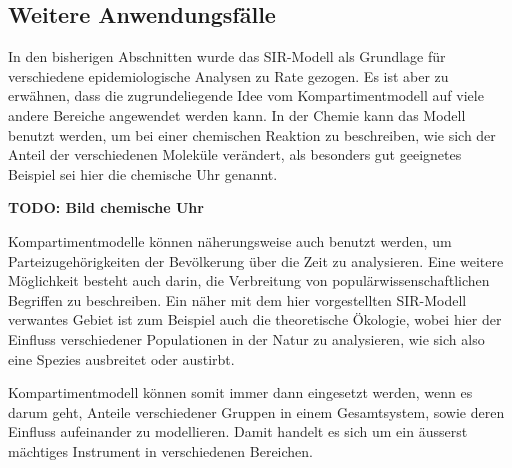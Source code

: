 \begin{refsection}
\section{Weitere Anwendungsfälle}
In den bisherigen Abschnitten wurde das SIR-Modell als Grundlage für verschiedene epidemiologische Analysen zu Rate gezogen.
Es ist aber zu erwähnen, dass die zugrundeliegende Idee vom Kompartimentmodell auf viele andere Bereiche angewendet werden kann.
In der Chemie kann das Modell benutzt werden, um bei einer chemischen Reaktion zu beschreiben, wie sich der Anteil der verschiedenen Moleküle verändert, als besonders gut geeignetes Beispiel sei hier die chemische Uhr genannt.

\textbf{TODO: Bild chemische Uhr}

Kompartimentmodelle können näherungsweise auch benutzt werden, um Parteizugehörigkeiten der Bevölkerung über die Zeit zu analysieren. 
Eine weitere Möglichkeit besteht auch darin, die Verbreitung von populärwissenschaftlichen Begriffen zu beschreiben. 
Ein näher mit dem hier vorgestellten SIR-Modell verwantes Gebiet ist zum Beispiel auch die theoretische Ökologie, wobei hier der Einfluss verschiedener Populationen in der Natur zu analysieren, wie sich also eine Spezies ausbreitet oder austirbt.

Kompartimentmodell können somit immer dann eingesetzt werden, wenn es darum geht, Anteile verschiedener Gruppen in einem Gesamtsystem, sowie deren Einfluss aufeinander zu modellieren. 
Damit handelt es sich um ein äusserst mächtiges Instrument in verschiedenen Bereichen. 


\printbibliography[heading=subbibliography]
\end{refsection}

